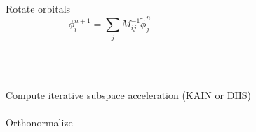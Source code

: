 \documentclass[mathserif, 10pt]{beamer}
\begin{document}
\begin{frame}
{\begin{columns}
    \begin{column}[b]{0.4\textwidth}
    \centering
    Rotate orbitals
    \begin{equation}
	\nonumber
	\phi_i^{n+1} = \sum_jM^{-1}_{ij}\tilde{\phi}_j^n
    \end{equation}
    \end{column}
    \begin{column}[b]{0.1\textwidth}
    \ \\
    \end{column}
    \end{columns}
    \ \\
    \ \\
    \pause
    Compute iterative subspace acceleration (KAIN or DIIS)\\
    \ \\
    Orthonormalize\\
    \ \\
    }
\end{frame}
\end{document}
